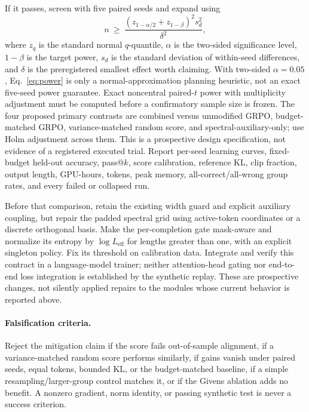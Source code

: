\documentclass{article}
\begin{document}
If it passes, screen with five paired seeds and expand using
\begin{equation}
 n\ \geq\ \frac{(z_{1-\alpha/2}+z_{1-\beta})^2s_d^2}{\delta^2},
 \label{eq:power}
\end{equation}
where $z_q$ is the standard normal $q$-quantile, $\alpha$ is the two-sided
significance level, $1-\beta$ is the target power,
$s_d$ is the standard deviation of within-seed differences, and $\delta$
is the preregistered smallest effect worth claiming.  With two-sided
$\alpha=0.05$, Eq.~\eqref{eq:power} is only a normal-approximation planning
heuristic, not an exact five-seed power guarantee. Exact noncentral paired-$t$
power with multiplicity adjustment must be computed before a confirmatory
sample size is frozen. The four proposed primary contrasts are combined
versus unmodified GRPO, budget-matched GRPO, variance-matched random score,
and spectral-auxiliary-only; use Holm adjustment across them. This is a
prospective design specification, not evidence of a registered executed trial.
Report per-seed learning curves, fixed-budget
held-out accuracy, pass@$k$, score calibration, reference KL, clip fraction,
output length, GPU-hours, tokens, peak memory, all-correct/all-wrong group
rates, and every failed or collapsed run.

Before that comparison, retain the existing width guard and explicit auxiliary
coupling, but repair the padded spectral grid using active-token coordinates
or a discrete orthogonal basis. Make the per-completion gate mask-aware and
normalize its entropy by $\log L_{\mathrm{eff}}$ for lengths greater than one,
with an explicit singleton policy. Fix its threshold on calibration data.
Integrate and verify this contract in a language-model trainer; neither
attention-head gating nor end-to-end loss integration is established by the
synthetic replay. These are prospective changes, not silently applied repairs
to the modules whose current behavior is reported above.

\paragraph{Falsification criteria.}
Reject the mitigation claim if the score fails out-of-sample alignment, if a
variance-matched random score performs similarly, if gains vanish under paired
seeds, equal tokens, bounded KL, or the budget-matched baseline, if a simple
resampling/larger-group control matches it, or if the Givens ablation adds no
benefit.  A nonzero gradient, norm identity, or passing synthetic test is never
a success criterion.
\end{document}
